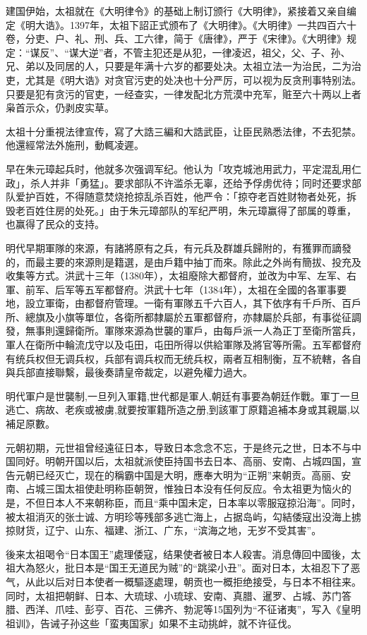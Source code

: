 建国伊始，太祖就在《大明律令》的基础上制订颁行《大明律》，紧接着又亲自编定《明大诰》。1397年，太祖下詔正式颁布了《大明律》。《大明律》一共四百六十卷，分吏、户、礼、刑、兵、工六律，简于《唐律》，严于《宋律》。《大明律》规定：“谋反”、“谋大逆”者，不管主犯还是从犯，一律凌迟，祖父，父、子、孙、兄、弟以及同居的人，只要是年满十六岁的都要处决。太祖立法一为治民，二为治吏，尤其是《明大诰》对贪官污吏的处决也十分严厉，可以视为反贪刑事特别法。只要是犯有贪污的官吏，一经查实，一律发配北方荒漠中充军，赃至六十两以上者枭首示众，仍剥皮实草。

太祖十分重視法律宣传，寫了大誥三編和大誥武臣，让臣民熟悉法律，不去犯禁。他還經常法外施刑，動輒凌遲。

早在朱元璋起兵时，他就多次强调军纪。他认为「攻克城池用武力，平定混乱用仁政」，杀人并非「勇猛」。要求部队不许滥杀无辜，还给予俘虏优待；同时还要求部队爱护百姓，不得随意焚烧抢掠乱杀百姓，他严令：「掠夺老百姓财物者处死，拆毁老百姓住房的处死。」由于朱元璋部队的军纪严明，朱元璋赢得了部属的尊重，也赢得了民众的支持。

明代早期軍隊的來源，有諸將原有之兵，有元兵及群雄兵歸附的，有獲罪而謫發的，而最主要的來源則是籍選，是由戶籍中抽丁而來。除此之外尚有簡拔、投充及收集等方式。洪武十三年（1380年），太祖廢除大都督府，並改为中军、左军、右軍、前军、后军等五军都督府。洪武十七年（1384年），太祖在全國的各軍事要地，設立軍衛，由都督府管理。一衛有軍隊五千六百人，其下依序有千戶所、百戶所、總旗及小旗等單位，各衛所都隸屬於五軍都督府，亦隸屬於兵部，有事從征調發，無事則還歸衛所。軍隊來源為世襲的軍戶，由每戶派一人為正丁至衛所當兵，軍人在衛所中輪流戊守以及屯田，屯田所得以供給軍隊及將官等所需。五军都督府有统兵权但无调兵权，兵部有调兵权而无统兵权，兩者互相制衡，互不統轄，各自與兵部直接聯繫，最後奏請皇帝裁定，以避免權力過大。

明代軍户是世襲制,一旦列入軍籍,世代都是軍人,朝廷有事要為朝廷作戰。軍丁一旦逃亡、病故、老疾或被虜,就要按軍籍所造之册,到該軍丁原籍追補本身或其親屬,以補足原數。

元朝初期，元世祖曾经遠征日本，导致日本念念不忘，于是终元之世，日本不与中国同好。明朝开国以后，太祖就派使臣持国书去日本、高丽、安南、占城四国，宣告元朝已经灭亡，现在的稱霸中国是大明，應奉大明为“正朔”来朝贡。高丽、安南、占城三国太祖使赴明称臣朝贺，惟独日本没有任何反应。令太祖更为恼火的是，不但日本人不来朝称臣，而且“乘中国未定，日本率以零服寇掠沿海”。同时，被太祖消灭的张士诚、方明珍等残部多逃亡海上，占据岛屿，勾結倭寇出没海上掳掠财货，辽宁、山东、福建、浙江、广东，“滨海之地，无岁不受其害”。

後来太祖喝令“日本国王”處理倭寇，结果使者被日本人殺害。消息傳回中國後，太祖大為怒火，批日本是“国王无道民为贼”的“跳梁小丑”。面对日本，太祖忍下了恶气，从此以后对日本使者一概驅逐處理，朝贡也一概拒绝接受，与日本不相往来。同时，太祖把朝鲜、日本、大琉球、小琉球、安南、真腊、暹罗、占城、苏门答腊、西洋、爪哇、彭亨、百花、三佛齐、勃泥等15国列为“不征诸夷”，写入《皇明祖训》，告诫子孙这些「蛮夷国家」如果不主动挑衅，就不许征伐。

